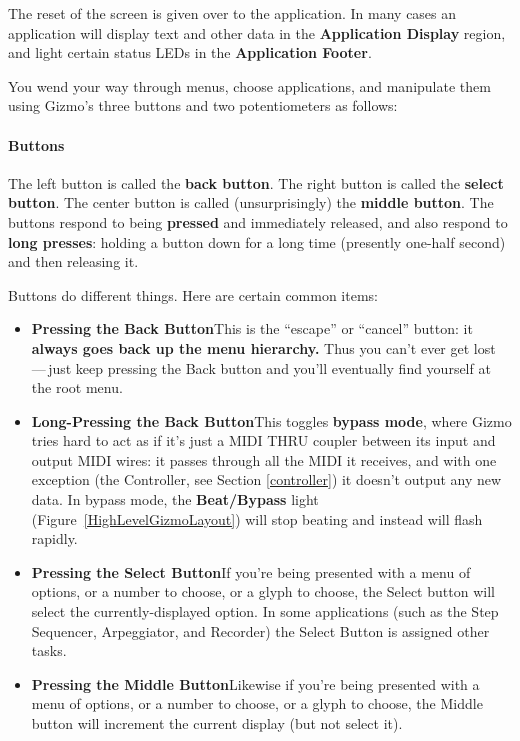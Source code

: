 \documentclass{article}
\begin{document}
The reset of the screen is given over to the application.  In many cases an application will display text and other data in the {\bf Application Display} region, and light certain status LEDs in the {\bf Application Footer}.

You wend your way through menus, choose applications, and manipulate them using Gizmo's three buttons and two potentiometers as follows:

\paragraph{Buttons}  The left button is called the {\bf back button}.  The right button is called the {\bf select button}.  The center button is called (unsurprisingly) the {\bf middle button}.   The buttons respond to being {\bf pressed} and immediately released, and also respond to {\bf long presses}: holding a button down for a long time (presently one-half second) and then releasing it. 


Buttons do different things.  Here are certain common items:

\begin{itemize}
\item {\bf Pressing the Back Button}\quad This is the ``escape'' or ``cancel'' button: it {\bf always goes back up the menu hierarchy.}  Thus you can't ever get lost\,---\,just keep pressing the Back button and you'll eventually find yourself at the root menu.
\item {\bf Long-Pressing the Back Button}\quad This toggles {\bf bypass mode}, where Gizmo tries hard to act as if it's just a MIDI THRU coupler between its input and output MIDI wires: it passes through all the MIDI it receives, and with one exception (the Controller, see Section \ref{controller}) it doesn't output any new data.  In bypass mode, the {\bf Beat/Bypass} light (Figure~\ref{HighLevelGizmoLayout}) will stop beating and instead will flash rapidly.
\end{itemize}

\begin{itemize}
\item {\bf Pressing the Select Button}\quad If you're being presented with a menu of options, or a number to choose, or a glyph to choose, the Select button will select the currently-displayed option.  In some applications (such as the Step Sequencer, Arpeggiator, and Recorder) the Select Button is assigned other tasks.
\item {\bf Pressing the Middle Button}\quad Likewise if you're being presented with a menu of options, or a number to choose, or a glyph to choose, the Middle button will increment the current display (but not select it). 
\end{itemize}
\end{document}
